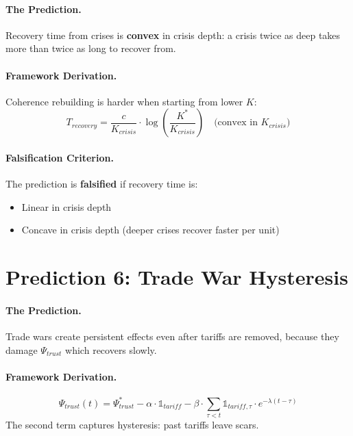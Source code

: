 \paragraph{The Prediction.}
Recovery time from crises is \textbf{convex} in crisis depth: a crisis twice as deep takes more than twice as long to recover from.

\paragraph{Framework Derivation.}
Coherence rebuilding is harder when starting from lower $K$:
\begin{equation}
    T_{recovery} = \frac{c}{K_{crisis}} \cdot \log\left(\frac{K^*}{K_{crisis}}\right) \quad \text{(convex in } K_{crisis}\text{)}
\end{equation}

\paragraph{Falsification Criterion.}
The prediction is \textbf{falsified} if recovery time is:
\begin{itemize}
    \item Linear in crisis depth
    \item Concave in crisis depth (deeper crises recover faster per unit)
\end{itemize}


\section{Prediction 6: Trade War Hysteresis}
\label{sec:S-prediction6}

\paragraph{The Prediction.}
Trade wars create persistent effects even after tariffs are removed, because they damage $\Psi_{trust}$ which recovers slowly.

\paragraph{Framework Derivation.}
\begin{equation}
    \Psi_{trust}(t) = \Psi_{trust}^* - \alpha \cdot \mathbb{1}_{tariff} - \beta \cdot \sum_{\tau < t} \mathbb{1}_{tariff,\tau} \cdot e^{-\lambda(t-\tau)}
\end{equation}
The second term captures hysteresis: past tariffs leave scars.

